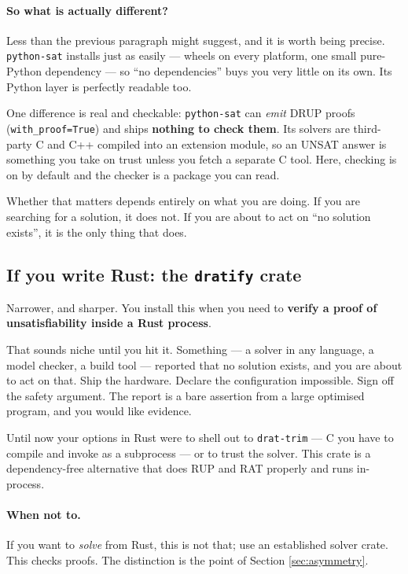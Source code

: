 \documentclass[11pt,a4paper]{article}
\newcommand{\pkg}[1]{\texttt{#1}}
\begin{document}
\paragraph{So what is actually different?} Less than the previous paragraph
might suggest, and it is worth being precise. \pkg{python-sat} installs just as
easily --- wheels on every platform, one small pure-Python dependency --- so
``no dependencies'' buys you very little on its own. Its Python layer is
perfectly readable too.

One difference is real and checkable: \pkg{python-sat} can \emph{emit} DRUP
proofs (\texttt{with\_proof=True}) and ships \textbf{nothing to check them}. Its
solvers are third-party C and C++ compiled into an extension module, so an
UNSAT answer is something you take on trust unless you fetch a separate C tool.
Here, checking is on by default and the checker is a package you can read.

Whether that matters depends entirely on what you are doing. If you are
searching for a solution, it does not. If you are about to act on ``no solution
exists'', it is the only thing that does.

\subsection*{If you write Rust: the \pkg{dratify} crate}

Narrower, and sharper. You install this when you need to \textbf{verify a
proof of unsatisfiability inside a Rust process}.

That sounds niche until you hit it. Something --- a solver in any language, a
model checker, a build tool --- reported that no solution exists, and you are
about to act on that. Ship the hardware. Declare the configuration impossible.
Sign off the safety argument. The report is a bare assertion from a large
optimised program, and you would like evidence.

Until now your options in Rust were to shell out to \texttt{drat-trim} --- C
you have to compile and invoke as a subprocess --- or to trust the solver. This
crate is a dependency-free alternative that does RUP and RAT properly and runs
in-process.

\paragraph{When not to.} If you want to \emph{solve} from Rust, this is not
that; use an established solver crate. This checks proofs. The distinction is
the point of Section \ref{sec:asymmetry}.
\end{document}
